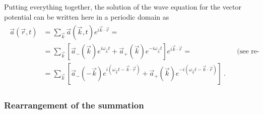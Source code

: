 \documentclass[letterpaper,10pt,english]{jupyterBook}
\begin{document}
\sphinxAtStartPar
{} Putting everything together, the solution of the wave equation for the vector potential can be written \sphinxhyphen{} here in a periodic domain \sphinxhyphen{} as
\begin{equation}\label{equation:ch/quantum-mechanics/qft/photons-coulomb:eq:photons-coulomb:vector-potential:fourier}
\begin{split}\begin{aligned}
  \vec{a}(\vec{r},t) 
  & = \sum_{\vec{k}} \vec{a}(\vec{k},t) e^{i \vec{k} \cdot \vec{r}} = \\
  & = \sum_{\vec{k}} \left[ \vec{a}_{-}(\vec{k}) e^{i \omega_{\vec{k}} t} + \vec{a}_{+}(\vec{k}) e^{- i \omega_{\vec{k}} t}  \right] e^{i \vec{k} \cdot \vec{r}} = && \text{(see re-arrangement)} \\
  & = \sum_{\vec{k}} \left[ \vec{a}_{-}(-\vec{k}) e^{i ( \omega_{\vec{k}} t - \vec{k} \cdot \vec{r} )} + \vec{a}_{+}(\vec{k}) e^{- i ( \omega_{\vec{k}} t - \vec{k} \cdot \vec{r})}  \right] \ .
\end{aligned}\end{split}
\end{equation}\subsubsection*{Re\sphinxhyphen{}arrangement of the summation}
\end{document}
